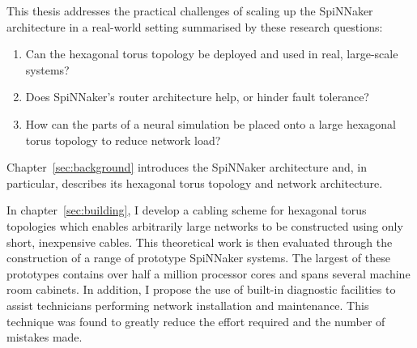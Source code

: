 %

This thesis addresses the practical challenges of scaling up the SpiNNaker
architecture in a real-world setting summarised by these research questions:

\begin{enumerate}
	
	\item Can the hexagonal torus topology be deployed and used in real,
	large-scale systems?
	
	\item Does SpiNNaker's router architecture help, or hinder fault tolerance?
	
	\item How can the parts of a neural simulation be placed onto a large
	hexagonal torus topology to reduce network load?
	
\end{enumerate}

%

Chapter~\ref{sec:background} introduces the SpiNNaker architecture and, in
particular, describes its hexagonal torus topology and network architecture.

In chapter~\ref{sec:building}, I develop a cabling scheme for hexagonal torus
topologies which enables arbitrarily large networks to be constructed using
only short, inexpensive cables. This theoretical work is then evaluated through
the construction of a range of prototype SpiNNaker systems. The largest of
these prototypes contains over half a million processor cores and spans several
machine room cabinets. In addition, I propose the use of built-in diagnostic
facilities to assist technicians performing network installation and
maintenance. This technique was found to greatly reduce the effort required and
the number of mistakes made.

